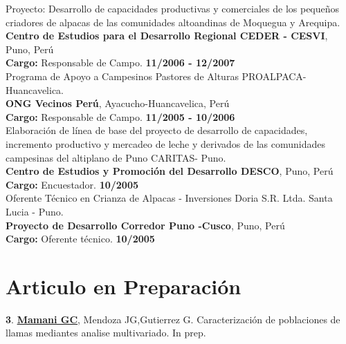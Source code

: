\documentclass[margin,line,10pt]{res}
\newenvironment{list1}{
  \begin{list}{\ding{113}}{%
      \setlength{\itemsep}{0in}
      \setlength{\parsep}{0in} \setlength{\parskip}{0in}
      \setlength{\topsep}{0in} \setlength{\partopsep}{0in} 
      \setlength{\leftmargin}{0.17in}}}{\end{list}}
\begin{document}
\begin{resume}
Proyecto: Desarrollo de capacidades productivas y comerciales de los pequeños criadores de alpacas de las comunidades altoandinas de Moquegua y Arequipa.\\
{\bf Centro de Estudios para el Desarrollo Regional CEDER - CESVI}, Puno, Perú\\
\vspace{-.3cm}
\textbf{Cargo:} Responsable de Campo.  \hfill {\bf 11/2006 - 12/2007}\\

Programa de Apoyo a Campesinos Pastores de Alturas PROALPACA-Huancavelica.\\
{\bf ONG Vecinos Perú}, Ayacucho-Huancavelica, Perú\\
\vspace{-.3cm}
\textbf{Cargo:} Responsable de Campo.  \hfill {\bf 11/2005 - 10/2006}\\

Elaboración de línea de base del proyecto de desarrollo de capacidades, incremento productivo y mercadeo de leche y derivados de las comunidades campesinas del altiplano de Puno CARITAS- Puno.\\
{\bf Centro de Estudios y Promoción del Desarrollo DESCO}, Puno, Perú\\
\vspace{-.3cm}
\textbf{Cargo:} Encuestador.  \hfill {\bf 10/2005}\\

Oferente Técnico en Crianza de Alpacas - Inversiones Doria S.R. Ltda. Santa Lucia - Puno.\\
{\bf Proyecto de Desarrollo Corredor Puno -Cusco}, Puno, Perú\\
\vspace{-.3cm}
\textbf{Cargo:} Oferente técnico.  \hfill {\bf 10/2005}\\

\vspace{0.5cm}

\section{\sc Articulo en Preparación}

\begin{list1}

\item [{\bf 3}.]  {\bf \underline{Mamani GC}}, Mendoza JG,Gutierrez G.   
     Caracterización de poblaciones de llamas mediantes analise multivariado. In prep. %
\vspace{0.5cm}
     

\end{list1}
\end{resume}
\end{document}
